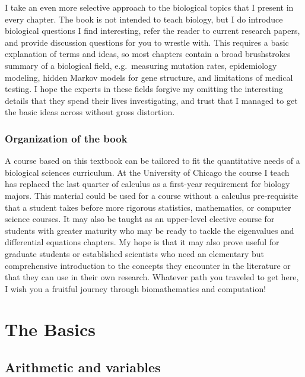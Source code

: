 \documentclass[
]{book}
\theoremstyle{definition}
\theoremstyle{definition}
\theoremstyle{definition}
\theoremstyle{remark}
\begin{document}
I take an even more selective approach to the biological topics that I present in every chapter. The book is not intended to teach biology, but I do introduce biological questions I find interesting, refer the reader to current research papers, and provide discussion questions for you to wrestle with. This requires a basic explanation of terms and ideas, so most chapters contain a broad brushstrokes summary of a biological field, e.g.~measuring mutation rates, epidemiology modeling, hidden Markov models for gene structure, and limitations of medical testing. I hope the experts in these fields forgive my omitting the interesting details that they spend their lives investigating, and trust that I managed to get the basic ideas across without gross distortion.

\hypertarget{organization-of-the-book}{%
\section{Organization of the book}\label{organization-of-the-book}}

A course based on this textbook can be tailored to fit the quantitative needs of a biological sciences curriculum. At the University of Chicago the course I teach has replaced the last quarter of calculus as a first-year requirement for biology majors. This material could be used for a course without a calculus pre-requisite that a student takes before more rigorous statistics, mathematics, or computer science courses. It may also be taught as an upper-level elective course for students with greater maturity who may be ready to tackle the eigenvalues and differential equations chapters. My hope is that it may also prove useful for graduate students or established scientists who need an elementary but comprehensive introduction to the concepts they encounter in the literature or that they can use in their own research. Whatever path you traveled to get here, I wish you a fruitful journey through biomathematics and computation!

\hypertarget{part-the-basics}{%
\part{The Basics}\label{part-the-basics}}

\hypertarget{arithmetic-and-variables}{%
\chapter{Arithmetic and variables}\label{arithmetic-and-variables}}
\end{document}
